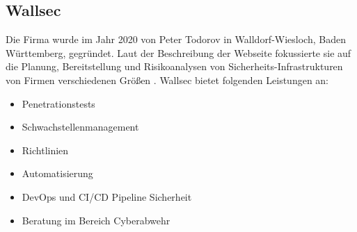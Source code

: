 \subsection{Wallsec}
Die Firma wurde im Jahr 2020 von Peter Todorov in Walldorf-Wiesloch, Baden Württemberg, gegründet. Laut der Beschreibung der Webseite fokussierte sie auf die Planung, Bereitstellung und Risikoanalysen von Sicherheits-Infrastrukturen von Firmen verschiedenen Größen \citep{Wallsec}. Wallsec bietet folgenden Leistungen an:

\begin{itemize}
   \item Penetrationstests
   \item Schwachstellenmanagement
   \item Richtlinien
   \item Automatisierung
   \item DevOps und CI/CD Pipeline Sicherheit
   \item Beratung im Bereich Cyberabwehr
\end{itemize}








